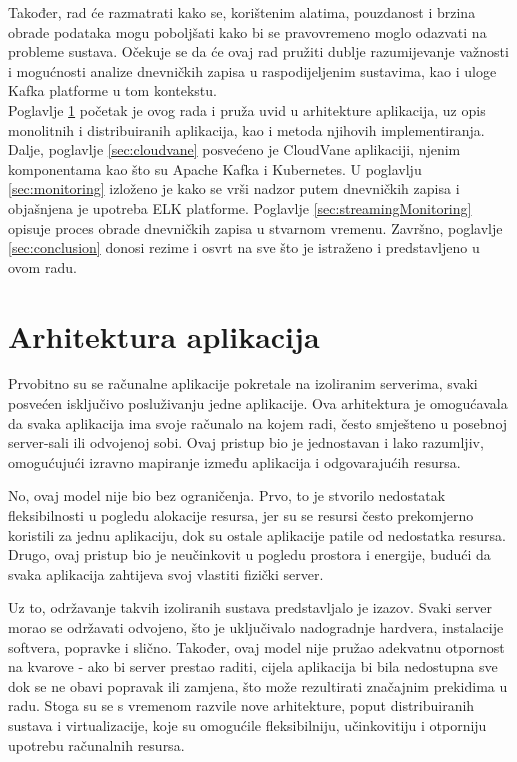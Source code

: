 \documentclass[times, utf8, diplomski]{fer}
\begin{document}
Također, rad će razmatrati kako se, korištenim alatima, pouzdanost i brzina obrade podataka mogu poboljšati kako bi se pravovremeno moglo odazvati na probleme sustava. Očekuje se da će ovaj rad pružiti dublje razumijevanje važnosti i mogućnosti analize dnevničkih zapisa u raspodijeljenim sustavima, kao i uloge Kafka platforme u tom kontekstu.\\

Poglavlje \ref{sec:app_arch} početak je ovog rada i pruža uvid u arhitekture aplikacija, uz opis monolitnih i distribuiranih aplikacija, kao i metoda njihovih implementiranja. Dalje, poglavlje \ref{sec:cloudvane} posvećeno je CloudVane aplikaciji, njenim komponentama kao što su Apache Kafka i Kubernetes. U poglavlju \ref{sec:monitoring} izloženo je kako se vrši nadzor putem dnevničkih zapisa i objašnjena je upotreba ELK platforme. Poglavlje \ref{sec:streamingMonitoring} opisuje proces obrade dnevničkih zapisa u stvarnom vremenu. Završno, poglavlje \ref{sec:conclusion} donosi rezime i osvrt na sve što je istraženo i predstavljeno u ovom radu.

\chapter{Arhitektura aplikacija}
\label{sec:app_arch}

Prvobitno su se računalne aplikacije pokretale na izoliranim serverima, svaki posvećen isključivo posluživanju jedne aplikacije. Ova arhitektura je omogućavala da svaka aplikacija ima svoje računalo na kojem radi, često smješteno u posebnoj server-sali ili odvojenoj sobi. Ovaj pristup bio je jednostavan i lako razumljiv, omogućujući izravno mapiranje između aplikacija i odgovarajućih resursa. 

No, ovaj model nije bio bez ograničenja. Prvo, to je stvorilo nedostatak fleksibilnosti u pogledu alokacije resursa, jer su se resursi često prekomjerno koristili za jednu aplikaciju, dok su ostale aplikacije patile od nedostatka resursa. Drugo, ovaj pristup bio je neučinkovit u pogledu prostora i energije, budući da svaka aplikacija zahtijeva svoj vlastiti fizički server.

Uz to, održavanje takvih izoliranih sustava predstavljalo je izazov. Svaki server morao se održavati odvojeno, što je uključivalo nadogradnje hardvera, instalacije softvera, popravke i slično. Također, ovaj model nije pružao adekvatnu otpornost na kvarove - ako bi server prestao raditi, cijela aplikacija bi bila nedostupna sve dok se ne obavi popravak ili zamjena, što može rezultirati značajnim prekidima u radu.
Stoga su se s vremenom razvile nove arhitekture, poput distribuiranih sustava i virtualizacije, koje su omogućile fleksibilniju, učinkovitiju i otporniju upotrebu računalnih resursa.\\
\end{document}
